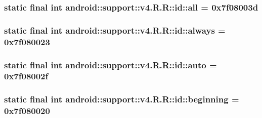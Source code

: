 \hypertarget{classandroid_1_1support_1_1v4_1_1_r_1_1id_2217ae3bd7e8ade259a6a522c0052a86}{
\subsubsection[{all}]{\setlength{\rightskip}{0pt plus 5cm}static final int android::support::v4.R.R::id::all = 0x7f08003d}}
\label{classandroid_1_1support_1_1v4_1_1_r_1_1id_2217ae3bd7e8ade259a6a522c0052a86}


\hypertarget{classandroid_1_1support_1_1v4_1_1_r_1_1id_38384bb2e3802d254f1e5aa48ade4559}{
\subsubsection[{always}]{\setlength{\rightskip}{0pt plus 5cm}static final int android::support::v4.R.R::id::always = 0x7f080023}}
\label{classandroid_1_1support_1_1v4_1_1_r_1_1id_38384bb2e3802d254f1e5aa48ade4559}


\hypertarget{classandroid_1_1support_1_1v4_1_1_r_1_1id_655887bcef7a5e320fa308e316d001bc}{
\subsubsection[{auto}]{\setlength{\rightskip}{0pt plus 5cm}static final int android::support::v4.R.R::id::auto = 0x7f08002f}}
\label{classandroid_1_1support_1_1v4_1_1_r_1_1id_655887bcef7a5e320fa308e316d001bc}


\hypertarget{classandroid_1_1support_1_1v4_1_1_r_1_1id_d9131d5f5b25bfbcb3ec121ee5d76007}{
\subsubsection[{beginning}]{\setlength{\rightskip}{0pt plus 5cm}static final int android::support::v4.R.R::id::beginning = 0x7f080020}}
\label{classandroid_1_1support_1_1v4_1_1_r_1_1id_d9131d5f5b25bfbcb3ec121ee5d76007}


